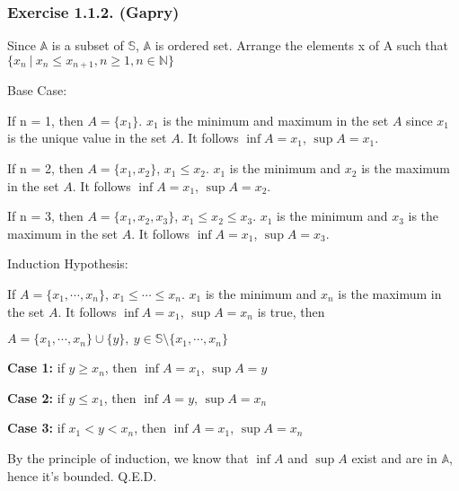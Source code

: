 \subsubsection*{Exercise 1.1.2. (Gapry)}

\begin{flushleft}
Since $\mathbb{A}$ is a subset of $\mathbb{S}$, $\mathbb{A}$ is ordered set. Arrange the elements x of A such that $\{ x_n \ | \ x_n \le x_{n + 1}, n \ge 1, n \in \mathbb{N} \}$
\end{flushleft}

\begin{flushleft}
Base Case: 

If n = 1, then $A = \{x_1\}$. $x_1$ is the minimum and maximum in the set $A$ since $x_1$ is the unique value in the set $A$. It follows $\inf A = x_1$, $\sup A = x_1$.

If n = 2, then $A = \{x_1, x_2\}$, $x_1 \le x_2$. $x_1$ is the minimum and $x_2$ is the maximum in the set $A$. It follows $\inf A = x_1$, $\sup A = x_2$.

If n = 3, then $A = \{x_1, x_2, x_3\}$, $x_1 \le x_2 \le x_3$. $x_1$ is the minimum and $x_3$ is the maximum in the set $A$. It follows $\inf A = x_1$, $\sup A = x_3$.

\end{flushleft}

\begin{flushleft}
Induction Hypothesis:

If $A = \{x_1, \cdots, x_n\}$, $x_1 \le \cdots \le x_n$. $x_1$ is the minimum and $x_n$ is the maximum in the set $A$. It follows $\inf A = x_1$, $\sup A = x_n$ is true, then

$A = \{x_1, \cdots, x_n\} \cup \{ y \},\ y \in \mathbb{S} \setminus \{x_1, \cdots, x_n\}$ 

\textbf{Case 1:}
if $y \ge x_n$, then $\inf A = x_1$, $\sup A = y$

\textbf{Case 2:}
if $y \le x_1$, then $\inf A = y$, $\sup A = x_n$

\textbf{Case 3:}
if $x_1 < y < x_n$, then $\inf A = x_1$, $\sup A = x_n$
\end{flushleft}

\begin{flushleft}
By the principle of induction, we know that $\inf A$ and $\sup A$ exist and are in $\mathbb{A}$, hence it's bounded. Q.E.D.
\end{flushleft}